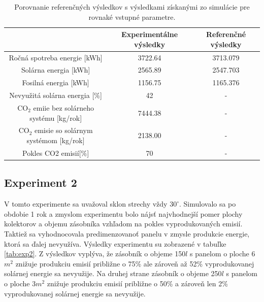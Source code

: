 \documentclass[a4paper, 11pt]{article}
\begin{document}
\begin{table}[H]
	\centering
	\begin{tabular}{|c|c|c|}
		\hline
		& Experimentálne výsledky & Referenčné výsledky \\ \hline
		Ročná spotreba energie {[}kWh{]} & 3722.64 & 3713.079 \\ \hline
		Solárna energia {[}kWh{]} & 2565.89 & 2547.703 \\ \hline
		Fosilná energia {[}kWh{]} & 1156.75 & 1165.376 \\ \hline
		Nevyužitá solárna energia {[}\%{]} & 42 & - \\ \hline
		CO$_2$ emiie bez solárneho systému {[}kg/rok{]} & 7444.38 & - \\ \hline
		CO$_2$ emisie so solárnym systémom {[}kg/rok{]} & 2138.00 & - \\ \hline
		Pokles CO2 emisií{[}\%{]} & 70 & - \\ \hline
	\end{tabular}
	\caption{Porovnanie referenčných výsledkov s výsledkami získanými zo simulácie pre rovnaké vstupné parametre.}
	\label{tab:exp1_output}
\end{table}

\subsection{Experiment 2} \label{experiment_2}
V tomto experimente sa uvažoval sklon strechy vždy $30^{\circ}$. Simulovalo sa po obdobie 1 rok a zmyslom experimentu bolo nájsť najvhodnejší pomer plochy kolektorov a objemu zásobníka vzhľadom na pokles vyprodukovaných emisií. Taktiež sa vyhodnocovala predimenzovanoť panelu v zmysle produkcie energie, ktorá sa ďalej nevyužíva. Výsledky experimentu su zobrazené v tabuľke \ref{tab:exp2}. Z výsledkov vyplýva, že zásobník o objeme 150$l$ s panelom o ploche 6$m^2$ znižuje produkciu emisií približne o 75\% ale zároveň až 52\% vyprodukovanej solárnej energie sa nevyužije. Na druhej strane zásobník o objeme 250$l$ s panelom o ploche 3$m^2$ znižuje produkciu emisií približne o 50\% a zároveň len 2\% vyprodukovanej solárnej energie sa nevyužije.
\end{document}
